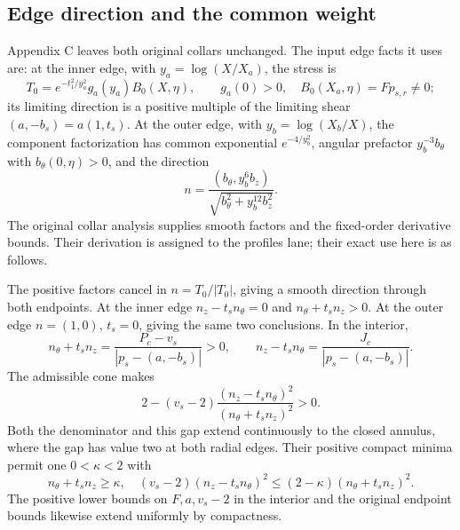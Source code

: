 \documentclass[10pt,a4paper]{article}
\begin{document}
\subsection{Edge direction and the common weight}\label{edge-direction-and-the-common-weight}

Appendix C leaves both original collars unchanged. The input edge facts it uses are: at the inner edge, with \(y_a=\log(X/X_a)\), the stress is \[
T_0=e^{-t_1^2/y_a^2}g_a(y_a)B_0(X,\eta),\qquad
g_a(0)>0,\quad B_0(X_a,\eta)=F p_{s,r}\ne0;
\] its limiting direction is a positive multiple of the limiting shear \((a,-b_s)=a(1,t_s)\). At the outer edge, with \(y_b=\log(X_b/X)\), the component factorization has common exponential \(e^{-4/y_b^2}\), angular prefactor \(y_b^{-3}b_\theta\) with \(b_\theta(0,\eta)>0\), and the direction \[
n=\frac{(b_\theta,y_b^6b_z)}
{\sqrt{b_\theta^2+y_b^{12}b_z^2}}.
\] The original collar analysis supplies smooth factors and the fixed-order derivative bounds. Their derivation is assigned to the profiles lane; their exact use here is as follows.

The positive factors cancel in \(n=T_0/|T_0|\), giving a smooth direction through both endpoints. At the inner edge \(n_z-t_sn_\theta=0\) and \(n_\theta+t_sn_z>0\). At the outer edge \(n=(1,0)\), \(t_s=0\), giving the same two conclusions. In the interior, \[
n_\theta+t_sn_z=\frac{P_c-v_s}{|p_s-(a,-b_s)|}>0,\qquad
n_z-t_sn_\theta=\frac{J_c}{|p_s-(a,-b_s)|}.
\] The admissible cone makes \[
2-(v_s-2)\frac{(n_z-t_sn_\theta)^2}{(n_\theta+t_sn_z)^2}>0.
\] Both the denominator and this gap extend continuously to the closed annulus, where the gap has value two at both radial edges. Their positive compact minima permit one \(0<\kappa<2\) with \[
n_\theta+t_sn_z\ge\kappa,\quad
(v_s-2)(n_z-t_sn_\theta)^2
\le(2-\kappa)(n_\theta+t_sn_z)^2.
\] The positive lower bounds on \(F,a,v_s-2\) in the interior and the original endpoint bounds likewise extend uniformly by compactness.
\end{document}
